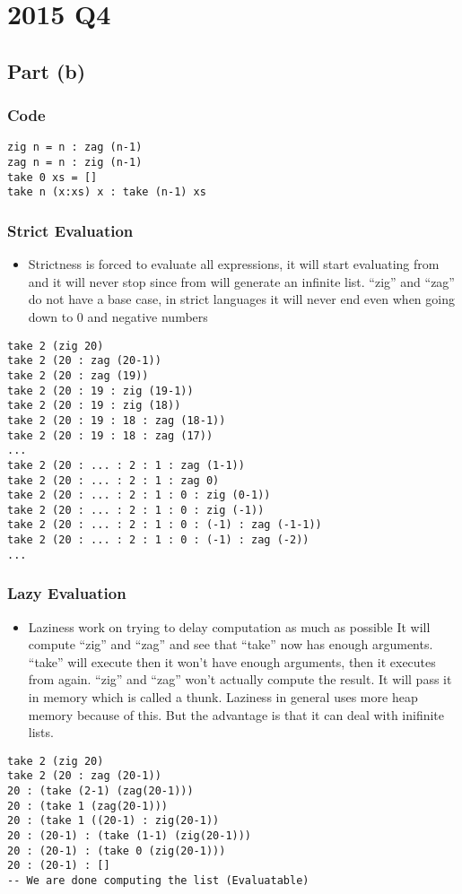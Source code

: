 \documentclass[11pt]{article}
\begin{document}
\section{2015 Q4}
\label{sec:org61dcac2}
\subsection{Part (b)}
\label{sec:org132aaed}
\subsubsection{Code}
\label{sec:orgd5a7c43}
\begin{verbatim}
zig n = n : zag (n-1)
zag n = n : zig (n-1)
take 0 xs = []
take n (x:xs) x : take (n-1) xs
\end{verbatim}
\subsubsection{Strict Evaluation}
\label{sec:org0d828b7}
\begin{itemize}
\item Strictness is forced to evaluate all expressions, it will start
evaluating from and it will never stop since from will generate
an infinite list. ``zig'' and ``zag'' do not have a base case, in strict
languages it will never end even when going down to 0 and negative
numbers
\end{itemize}
\begin{verbatim}
take 2 (zig 20)
take 2 (20 : zag (20-1))
take 2 (20 : zag (19))
take 2 (20 : 19 : zig (19-1))
take 2 (20 : 19 : zig (18))
take 2 (20 : 19 : 18 : zag (18-1))
take 2 (20 : 19 : 18 : zag (17))
...
take 2 (20 : ... : 2 : 1 : zag (1-1))
take 2 (20 : ... : 2 : 1 : zag 0)
take 2 (20 : ... : 2 : 1 : 0 : zig (0-1))
take 2 (20 : ... : 2 : 1 : 0 : zig (-1))
take 2 (20 : ... : 2 : 1 : 0 : (-1) : zag (-1-1))
take 2 (20 : ... : 2 : 1 : 0 : (-1) : zag (-2))
...
\end{verbatim}
\subsubsection{Lazy Evaluation}
\label{sec:orgc32f29c}
\begin{itemize}
\item Laziness work on trying to delay computation as much as possible
It will compute ``zig'' and ``zag'' and see that ``take'' now has enough arguments.
``take'' will execute then it won't have enough arguments, then it executes from
again. ``zig'' and ``zag'' won't actually compute the result. It will pass it in memory
which is called a thunk. Laziness in general uses more heap memory because of this.
But the advantage is that it can deal with inifinite lists.
\end{itemize}
\begin{verbatim}
take 2 (zig 20)
take 2 (20 : zag (20-1))
20 : (take (2-1) (zag(20-1)))
20 : (take 1 (zag(20-1)))
20 : (take 1 ((20-1) : zig(20-1))
20 : (20-1) : (take (1-1) (zig(20-1)))
20 : (20-1) : (take 0 (zig(20-1)))
20 : (20-1) : []
-- We are done computing the list (Evaluatable)
\end{verbatim}
\end{document}
